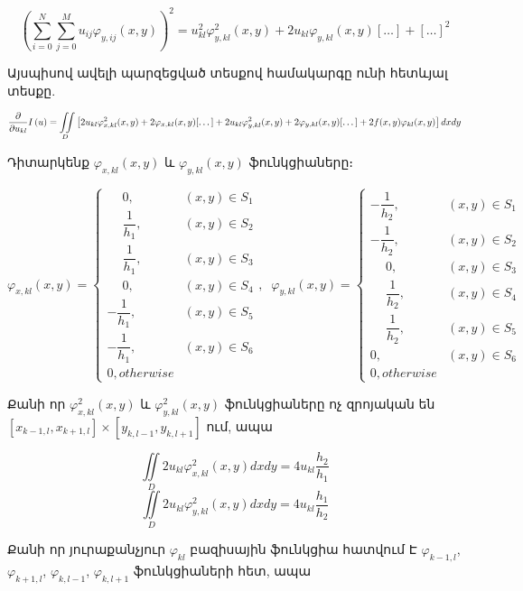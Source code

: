 \documentclass[fleqn, bachelor,subf,12pt,notitlepage]{disser}
\newcommand\scalemath[2]{\scalebox{#1}{\mbox{\ensuremath{\displaystyle #2}}}}
\begin{document}
				$$\left(\sum_{i=0}^{N} \sum_{j=0}^{M}u_{ij}\varphi_{y, ij}(x,y)\right)^2 = u_{kl}^2\varphi_{y, kl}^2(x,y) + 2u_{kl}\varphi_{y, kl}(x,y)[\dots] + [\dots]^2$$

\noindent Այսպիսով ավելի պարզեցված տեսքով համակարգը ունի հետևյալ տեսքը.

$$\scalemath{0.85}{\frac{\partial}{\partial u_{kl}}I \left(u\right)= \iint \limits_{D} \left[2u_{kl}\varphi_{x, kl}^2(x,y) + 2\varphi_{x, kl}(x,y)[\dots] + 2u_{kl}\varphi_{y, kl}^2(x,y) + 2\varphi_{y, kl}(x,y)[\dots] + 2f(x,y)\varphi_{kl}(x,y)\right]dxdy}$$

\noindent Դիտարկենք $\varphi_{x, kl}(x,y) $ և $\varphi_{y, kl}(x,y) $ ֆունկցիաները։


$$ \varphi_{x, kl}(x,y)  = \begin{cases}
\phantom{-}0, &(x,y) \in S_{1} \\
\phantom{-}\dfrac{1}{h_{1}}, &(x,y) \in S_{2} \\
\phantom{-}\dfrac{1}{h_{1}}, &(x,y) \in S_{3} \\
\phantom{-}0, &(x,y) \in S_{4} \\
-\dfrac{1}{h_{1}}, &(x,y) \in S_{5} \\
-\dfrac{1}{h_{1}}, &(x,y) \in S_{6}\\
0, otherwise
\end{cases}, \;\; \varphi_{y, kl}(x,y)  = \begin{cases}
-\dfrac{1}{h_{2}}, &(x,y) \in S_{1} \\
-\dfrac{1}{h_{2}}, &(x,y) \in S_{2} \\
\phantom{-}0, &(x,y) \in S_{3} \\
\phantom{-}\dfrac{1}{h_{2}}, &(x,y) \in S_{4} \\
\phantom{-}\dfrac{1}{h_{2}}, &(x,y) \in S_{5} \\
0, &(x,y) \in S_{6}\\
0, otherwise
\end{cases} \;
$$

\noindent Քանի որ $\varphi_{x, kl}^2(x,y) $ և $\varphi_{y, kl}^2(x,y) $ ֆունկցիաները ոչ զրոյական են $\left[x_{k-1, l}, x_{k+1, l} \right] \times \left[y_{k, l-1}, y_{k, l+1}\right]$ ում, ապա

$$  \iint \limits_{D} 2u_{kl}\varphi_{x, kl}^2(x,y)dxdy = 4u_{kl}\dfrac{h_{2}}{h_{1}}$$
$$  \iint \limits_{D} 2u_{kl}\varphi_{y, kl}^2(x,y)dxdy = 4u_{kl}\dfrac{h_{1}}{h_{2}}$$

\noindent Քանի որ յուրաքանչյուր $\varphi_{kl}$ բազիսային ֆունկցիա հատվում Է $\varphi_{k-1, l}$, $\varphi_{k+1, l}$, $\varphi_{k, l-1}$, $\varphi_{k, l+1}$ ֆունկցիաների հետ, ապա
\end{document}
